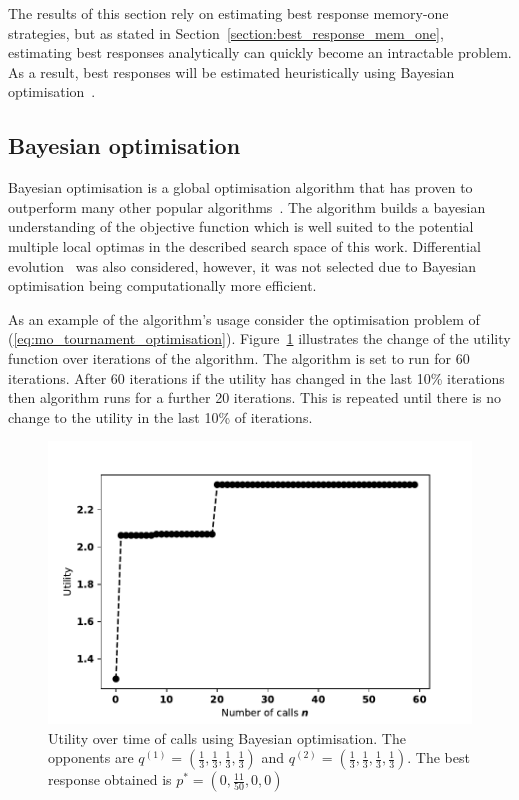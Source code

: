 The results of this section rely on estimating best response memory-one strategies, but as stated in
Section~\ref{section:best_response_mem_one}, estimating best responses
analytically can quickly become an intractable problem. As a result, best
responses will be estimated heuristically using Bayesian
optimisation~\cite{Mokus1978}. 

\subsection{Bayesian optimisation}

Bayesian optimisation is a global optimisation
algorithm that has proven to outperform many other popular
algorithms~\cite{Jones2001}. The algorithm builds a bayesian understanding of
the objective function which is well suited to the potential multiple local optimas in
the described search space of this work. Differential evolution~\cite{Storn1997}
was also considered, however, it was not selected due to Bayesian optimisation being
computationally more efficient.

As an example of the algorithm's usage consider the optimisation problem
of (\ref{eq:mo_tournament_optimisation}). Figure~\ref{bayesian_example}
illustrates the change of the utility function over iterations of the algorithm.
The algorithm is set to run for 60 iterations. After 60 iterations if the
utility has changed in the last 10\% iterations then algorithm runs for a
further 20 iterations. This is repeated until there is no change to the utility
in the last 10\% of iterations.


\begin{figure}[!htbp]
    \begin{center}
    \includegraphics[width=.5\linewidth]{src/chapters/05/paper/Memory-size-in-the-prisoners-dilemma/img/bayesian_example.pdf}
    \end{center}
    \caption{Utility over time of calls using Bayesian optimisation. The
    opponents are \(q^{(1)} = (\frac{1}{3}, \frac{1}{3}, \frac{1}{3},
    \frac{1}{3})\) and \(q^{(2)} = (\frac{1}{3}, \frac{1}{3},
    \frac{1}{3}, \frac{1}{3})\). The best response obtained is \(p^* = (0, \frac{11}{50}, 0, 0)\)}
    \label{bayesian_example}
\end{figure}

